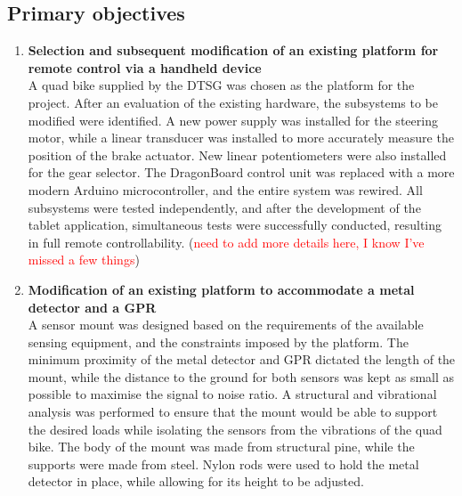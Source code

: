 \documentclass[main.tex]{subfiles}
\begin{document}
\subsection{Primary objectives}
\begin{enumerate}
\item \textbf{Selection and subsequent modification of an existing platform for remote control via a handheld device}\\ 
A quad bike supplied by the DTSG was chosen as the platform for the project. After an evaluation of the existing hardware, the subsystems to be modified were identified. A new power supply was installed for the steering motor, while a linear transducer was installed to more accurately measure the position of the brake actuator. New linear potentiometers were also installed for the gear selector. The DragonBoard control unit was replaced with a more modern Arduino microcontroller, and the entire system was rewired. All subsystems were tested independently, and after the development of the tablet application, simultaneous tests were successfully conducted, resulting in full remote controllability. (\textcolor{red}{need to add more details here, I know I've missed a few things})   

\item \textbf{Modification of an existing platform to accommodate a metal detector and a GPR}\\ 
A sensor mount was designed based on the requirements of the available sensing equipment, and the constraints imposed by the platform. The minimum proximity of the metal detector and GPR dictated the length of the mount, while the distance to the ground for both sensors was kept as small as possible to maximise the signal to noise ratio. A structural and vibrational analysis was performed to ensure that the mount would be able to support the desired loads while isolating the sensors from the vibrations of the quad bike. The body of the mount was made from structural pine, while the supports were made from steel. Nylon rods were used to hold the metal detector in place, while allowing for its height to be adjusted.   


\end{enumerate}
\end{document}
